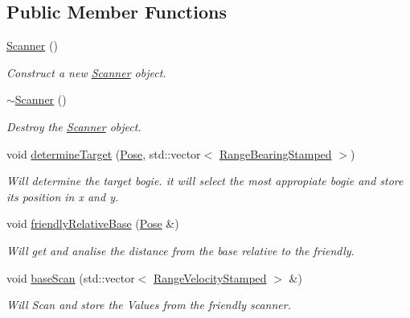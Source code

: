 \subsection*{Public Member Functions}
\begin{DoxyCompactItemize}
\item 
\mbox{\label{classScanner_acc995a4b67a10d2652ce00afed14f497}} 
\hyperlink{classScanner_acc995a4b67a10d2652ce00afed14f497}{Scanner} ()
\begin{DoxyCompactList}\small\item\em Construct a new \hyperlink{classScanner}{Scanner} object. \end{DoxyCompactList}\item 
\mbox{\label{classScanner_a39f85e20f3ca942fd0a8e4bce88c27c7}} 
\hyperlink{classScanner_a39f85e20f3ca942fd0a8e4bce88c27c7}{$\sim$\+Scanner} ()
\begin{DoxyCompactList}\small\item\em Destroy the \hyperlink{classScanner}{Scanner} object. \end{DoxyCompactList}\item 
void \hyperlink{classScanner_a846ec9883243c9837e0a910cd82e969d}{determine\+Target} (\hyperlink{structPose}{Pose}, std\+::vector$<$ \hyperlink{structRangeBearingStamped}{Range\+Bearing\+Stamped} $>$)
\begin{DoxyCompactList}\small\item\em Will determine the target bogie. it will select the most appropiate bogie and store its position in x and y. \end{DoxyCompactList}\item 
void \hyperlink{classScanner_ad0f7c663c60e8315c5f99935de8e9ecb}{friendly\+Relative\+Base} (\hyperlink{structPose}{Pose} \&)
\begin{DoxyCompactList}\small\item\em Will get and analise the distance from the base relative to the friendly. \end{DoxyCompactList}\item 
void \hyperlink{classScanner_ad18851f19a61b642c699f425b62911a4}{base\+Scan} (std\+::vector$<$ \hyperlink{structRangeVelocityStamped}{Range\+Velocity\+Stamped} $>$ \&)
\begin{DoxyCompactList}\small\item\em Will Scan and store the Values from the friendly scanner. \end{DoxyCompactList}\item 

\end{DoxyCompactItemize}
